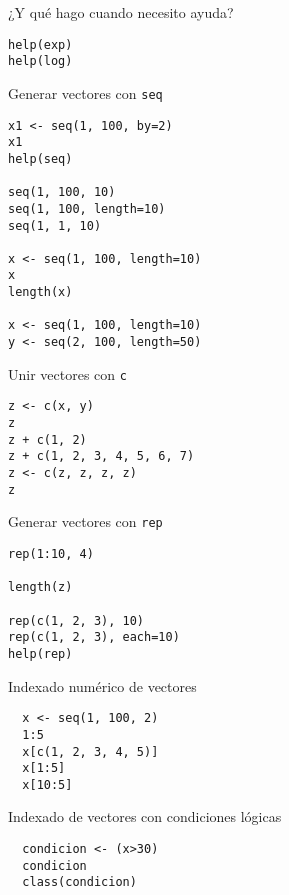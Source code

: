 \documentclass[xcolor={usenames,svgnames,dvipsnames}]{beamer}
\begin{document}
\begin{frame}[fragile,label=sec-2-1-4]{¿Y qué hago cuando necesito ayuda?}
 \lstset{language=R,label= ,caption= ,numbers=none}
\begin{lstlisting}
help(exp)
help(log)
\end{lstlisting}
\end{frame}

\begin{frame}[fragile,label=sec-2-1-5]{Generar vectores con \texttt{seq}}
 \lstset{language=R,label= ,caption= ,numbers=none}
\begin{lstlisting}
x1 <- seq(1, 100, by=2)
x1
help(seq)

seq(1, 100, 10)
seq(1, 100, length=10)
seq(1, 1, 10)

x <- seq(1, 100, length=10)
x
length(x)

x <- seq(1, 100, length=10)
y <- seq(2, 100, length=50)
\end{lstlisting}
\end{frame}

\begin{frame}[fragile,label=sec-2-1-6]{Unir vectores con \texttt{c}}
 \lstset{language=R,label= ,caption= ,numbers=none}
\begin{lstlisting}
z <- c(x, y)
z
z + c(1, 2)
z + c(1, 2, 3, 4, 5, 6, 7)
z <- c(z, z, z, z)
z
\end{lstlisting}
\end{frame}

\begin{frame}[fragile,label=sec-2-1-7]{Generar vectores con \texttt{rep}}
 \lstset{language=R,label= ,caption= ,numbers=none}
\begin{lstlisting}
rep(1:10, 4)

length(z)

rep(c(1, 2, 3), 10)
rep(c(1, 2, 3), each=10)
help(rep)
\end{lstlisting}
\end{frame}


\begin{frame}[fragile,label=sec-2-1-8]{Indexado numérico de vectores}
 \lstset{language=R,label= ,caption= ,numbers=none}
\begin{lstlisting}
  x <- seq(1, 100, 2)
  1:5
  x[c(1, 2, 3, 4, 5)]
  x[1:5]
  x[10:5]
\end{lstlisting}
\end{frame}

\begin{frame}[fragile,label=sec-2-1-9]{Indexado de vectores con condiciones lógicas}
 \lstset{language=R,label= ,caption= ,numbers=none}
\begin{lstlisting}
  condicion <- (x>30)
  condicion
  class(condicion)
\end{lstlisting}
\end{frame}
\end{document}
